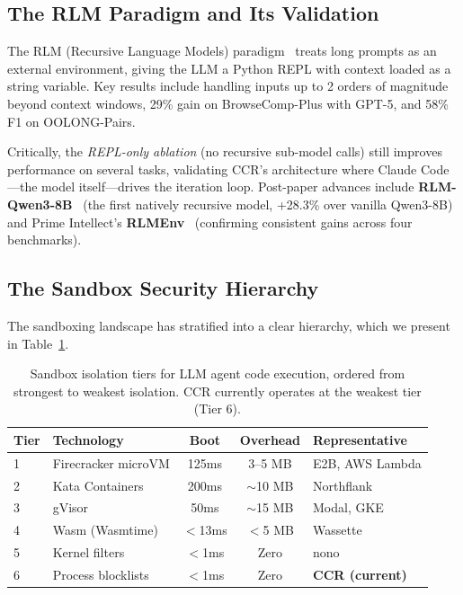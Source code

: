 \documentclass[11pt]{article}
\begin{document}
\subsection{The RLM Paradigm and Its Validation}

The RLM (Recursive Language Models) paradigm~\cite{rlm} treats long prompts as an external environment, giving the LLM a Python REPL with context loaded as a string variable. Key results include handling inputs up to 2 orders of magnitude beyond context windows, 29\% gain on BrowseComp-Plus with GPT-5, and 58\% F1 on OOLONG-Pairs.

Critically, the \textit{REPL-only ablation} (no recursive sub-model calls) still improves performance on several tasks, validating CCR's architecture where Claude Code---the model itself---drives the iteration loop. Post-paper advances include \textbf{RLM-Qwen3-8B}~\cite{rlm_qwen3} (the first natively recursive model, +28.3\% over vanilla Qwen3-8B) and Prime Intellect's \textbf{RLMEnv}~\cite{rlmenv} (confirming consistent gains across four benchmarks).

\subsection{The Sandbox Security Hierarchy}

The sandboxing landscape has stratified into a clear hierarchy, which we present in Table~\ref{tab:sandbox}.

\begin{table}[h]
\centering
\caption{Sandbox isolation tiers for LLM agent code execution, ordered from strongest to weakest isolation. CCR currently operates at the weakest tier (Tier 6).}
\label{tab:sandbox}
\small
\begin{tabular}{@{}llccp{3.2cm}@{}}
\toprule
\textbf{Tier} & \textbf{Technology} & \textbf{Boot} & \textbf{Overhead} & \textbf{Representative} \\
\midrule
1 & Firecracker microVM & 125ms & 3--5 MB & E2B, AWS Lambda \\
2 & Kata Containers & 200ms & $\sim$10 MB & Northflank \\
3 & gVisor & 50ms & $\sim$15 MB & Modal, GKE \\
4 & Wasm (Wasmtime) & $<$13ms & $<$5 MB & Wassette~\cite{wassette} \\
5 & Kernel filters & $<$1ms & Zero & nono~\cite{nono} \\
6 & Process blocklists & $<$1ms & Zero & \textbf{CCR (current)} \\
\bottomrule
\end{tabular}
\end{table}
\end{document}

